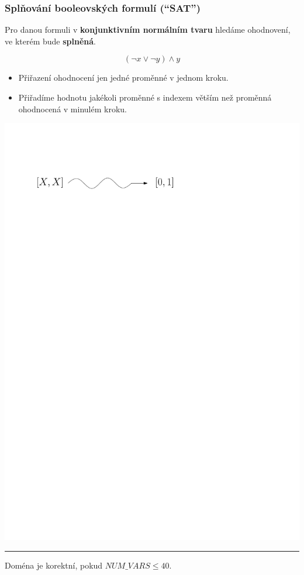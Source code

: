\documentclass[usenames,dvipsnames,9pt]{beamer}
\begin{document}
\begin{frame}
  \frametitle{Splňování booleovských formulí (``SAT'')}
  
  Pro danou formuli v {\bf konjunktivním normálním tvaru} hledáme ohodnovení, ve kterém bude {\bf splněná}.
  
  \begin{equation*}
  (\neg x\vee \neg y)\wedge y
  \end{equation*}
  
  \begin{itemize}
  \item Přiřazení ohodnocení jen jedné proměnné v jednom kroku.
  \item Přiřadíme hodnotu jakékoli proměnné s indexem větším než proměnná ohodnocená v minulém kroku.
  \end{itemize}
  
  \vspace{1em}

\begin{center}
\includegraphics[width=0.5\linewidth]{figs/sat.pdf}
\end{center}

\vspace{1em}\hrule\vspace{1em}

\faWarning\hspace{3pt} Doména je korektní, pokud $NUM\_VARS \leq 40$.
\end{frame}
\end{document}
